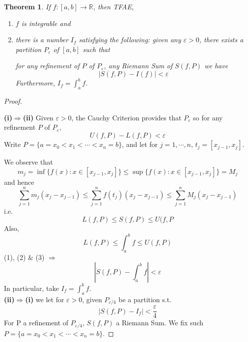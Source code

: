 \documentclass[12pt]{article}
\theoremstyle{plain}
\newtheorem{theorem}{Theorem}[subsection]
\newcommand{\abs}[1]{\left| #1 \right|}
\newcommand{\ep}{\varepsilon}
\begin{document}
	\begin{theorem}
		If $f:[a,b] \to \mathbb{R}$, then TFAE,
		\begin{enumerate}
			\item $f$ is integrable and 
			\item there is a number $I_f$ satisfying the following:
				given any $\ep>0$, there exists a partition $P_{\ep}$ of 
				$[a,b]$ such that 

				for any refinement of $P$ of $P_{\ep}$, any Riemann Sum of 
				$S(f,P)$ we have 
				\[
					\abs{S(f,P) - I(f)}<\ep
				\]
				Furthermore, $I_f = \int_a^b f$. 
		\end{enumerate}
	\end{theorem}
	\begin{proof}
		$ $
		
		\textbf{(i)$\Rightarrow$(ii)}
		Given $\ep>0$, the Cauchy Criterion provides that $P_{\ep}$
		so for any refinement $P$ of $P_{\ep}$, 
		\begin{equation}
			U(f,P)-L(f,P)<\ep
		\end{equation}
		Write $P = \{a=x_0<x_1<\cdots<x_n=b\}$, and let for 
		$j=1,\cdots, n$, $t_j = [x_{j-1}, x_j]$. 
		
		We observe that 
		\[
			m_j = \inf\{f(x) : x\in[x_{j-1}, x_j]\}
			\leq \sup\{f(x) : x \in [x_{j-1}, x_j]\}=M_j
		\]
		and hence 
		\[
			\sum_{j=1}^n m_j (x_j-x_{j-1}) \leq \sum_{j=1}^n f(t_j)
			(x_j-x_{j-1}) \leq \sum_{j=1}^n M_j (x_j-x_{j-1})
		\]
		i.e.
		\begin{equation}
			L(f,P) \leq S(f,P) \leq U(f,P
		\end{equation}
		Also, 
		\begin{equation}
			L(f,P) \leq \int_a^b f \leq U(f,P)
		\end{equation}
		 (1), (2) $\&$ (3) $\Rightarrow$ 
		\[
			\abs{S(f,P) - \int_a^b f} < \ep
		\]
		In particular, take $I_f = \int_a^b f$. \\

		\textbf{(ii)$\Rightarrow$(i)}
		we let for $\ep>0$, given $P_{\ep/4}$
		be a partition s.t. 
		\[
			\abs{S(f,P) - I_f} < \frac{\ep}4
		\]
		For P a refinement of $P_{\ep/4}$, $S(f,P)$ a Riemann Sum.
		We fix such $P = \{a=x_0<x_1<\cdots<x_n=b\}$. 


\end{proof}
\end{document}

